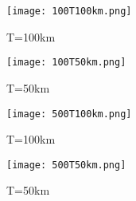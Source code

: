 \documentclass{article}
\begin{document}
\begin{figure}[H]
\centering
\texttt{[image: 100T100km.png]}
\caption{T=100km}
\end{figure}

\begin{figure}[H]
\centering
\texttt{[image: 100T50km.png]}
\caption{T=50km}
\end{figure}

\begin{figure}[H]
\centering
\texttt{[image: 500T100km.png]}
\caption{T=100km}
\end{figure}

\begin{figure}[H]
\centering
\texttt{[image: 500T50km.png]}
\caption{T=50km}

\end{figure}
\end{document}
